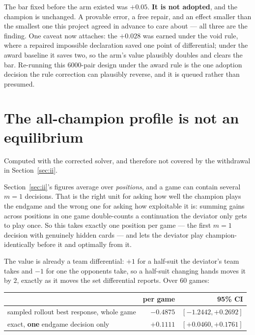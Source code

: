 \documentclass[11pt,a4paper]{article}
\begin{document}
The bar fixed before the arm existed was $+0.05$. \textbf{It is not adopted},
and the champion is unchanged. A provable error, a free repair, and an effect
smaller than the smallest one this project agreed in advance to care about ---
all three are the finding. One caveat now attaches: the $+0.028$ was earned
under the void rule, where a repaired impossible declaration saved one point
of differential; under the award baseline it saves two, so the arm's value
plausibly doubles and clears the bar. Re-running this 6000-pair design under
the award rule is the one adoption decision the rule correction can
plausibly reverse, and it is queued rather than presumed.

\section{The all-champion profile is not an equilibrium}
\label{sec:noneq}

Computed with the corrected solver, and therefore not covered by the
withdrawal in Section~\ref{sec:ii}.

Section~\ref{sec:ii}'s figures average over \emph{positions}, and a game can
contain several $m = 1$ decisions. That is the right unit for asking how well
the champion plays the endgame and the wrong one for asking how exploitable it
is: summing gains across positions in one game double-counts a continuation the
deviator only gets to play once. So this takes exactly one position per game ---
the first $m = 1$ decision with genuinely hidden cards --- and lets the deviator
play champion-identically before it and optimally from it.

The value is already a team differential: $+1$ for a half-suit the deviator's
team takes and $-1$ for one the opponents take, so a half-suit changing hands
moves it by $2$, exactly as it moves the set differential
 reports. Over 60 games:

\begin{center}
\begin{tabular}{lrr}
\toprule
 & per game & 95\% CI \\
\midrule
sampled rollout best response, whole game & $-0.4875$ & $[-1.2442, +0.2692]$ \\
exact, \textbf{one} endgame decision only & $\mathbf{+0.1111}$ & $[+0.0460, +0.1761]$ \\
\bottomrule
\end{tabular}
\end{center}
\end{document}
